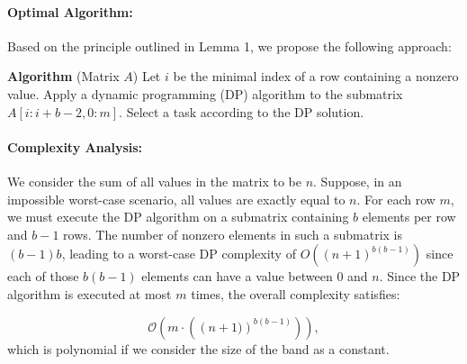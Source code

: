 \documentclass{article}
\begin{document}
\paragraph{Optimal Algorithm:} Based on the principle outlined in Lemma 1, we propose the following approach:

\begin{algorithmic}
\State \textbf{Algorithm} (Matrix $A$)
\State Let $i$ be the minimal index of a row containing a nonzero value.
\State Apply a dynamic programming (DP) algorithm to the submatrix $A[i : i + b - 2, 0:m]$.
\State Select a task according to the DP solution.
\EndWhile
\EndWhile
\end{algorithmic}

\paragraph{Complexity Analysis:}
We consider the sum of all values in the matrix to be $n$. Suppose, in an impossible  worst-case scenario, all values are exactly equal to $n$. For each row $m$, we must execute the DP algorithm on a submatrix containing $b$ elements per row and $b-1$ rows. The number of nonzero elements in such a submatrix is $(b-1)b$, leading to a worst-case DP complexity of $O((n+1)^{b(b-1)})$ since each of those $b(b-1)$ elements can have a value between $0$ and $n$. Since the DP algorithm is executed at most $m$ times, the overall complexity satisfies:

\begin{equation*}
\mathcal{O}\left(
	m \cdot \left( \left(n+1)\right)^{b(b-1)}\right)
	\right),
\end{equation*}
which is polynomial if we consider the size of the band as a constant.
\end{document}
